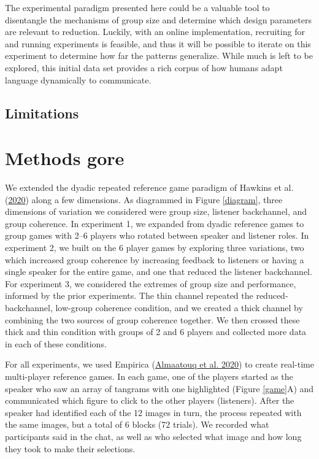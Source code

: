 \documentclass[
  english,
  a4paper,
]{article}
\begin{document}
The experimental paradigm presented here could be a valuable tool to disentangle the mechanisms of group size and determine which design parameters are relevant to reduction. Luckily, with an online implementation, recruiting for and running experiments is feasible, and thus it will be possible to iterate on this experiment to determine how far the patterns generalize. While much is left to be explored, this initial data set provides a rich corpus of how humans adapt language dynamically to communicate.

\hypertarget{limitations}{%
\subsection{Limitations}\label{limitations}}

\hypertarget{methods-gore}{%
\section{Methods gore}\label{methods-gore}}

We extended the dyadic repeated reference game paradigm of Hawkins et al. (\protect\hyperlink{ref-hawkinsCharacterizingDynamicsLearning2020}{2020}) along a few dimensions. As diagrammed in Figure \ref{diagram}, three dimensions of variation we considered were group size, listener backchannel, and group coherence. In experiment 1, we expanded from dyadic reference games to group games with 2--6 players who rotated between speaker and listener roles. In experiment 2, we built on the 6 player games by exploring three variations, two which increased group coherence by increasing feedback to listeners or having a single speaker for the entire game, and one that reduced the listener backchannel. For experiment 3, we considered the extremes of group size and performance, informed by the prior experiments. The thin channel repeated the reduced-backchannel, low-group coherence condition, and we created a thick channel by combining the two sources of group coherence together. We then crossed these thick and thin condition with groups of 2 and 6 players and collected more data in each of these conditions.

For all experiments, we used Empirica (\protect\hyperlink{ref-almaatouqEmpiricaVirtualLab2020}{Almaatouq et al. 2020}) to create real-time multi-player reference games. In each game, one of the players started as the speaker who saw an array of tangrams with one highlighted (Figure \ref{game}A) and communicated which figure to click to the other players (listeners). After the speaker had identified each of the 12 images in turn, the process repeated with the same images, but a total of 6 blocks (72 trials). We recorded what participants said in the chat, as well as who selected what image and how long they took to make their selections.
\end{document}
